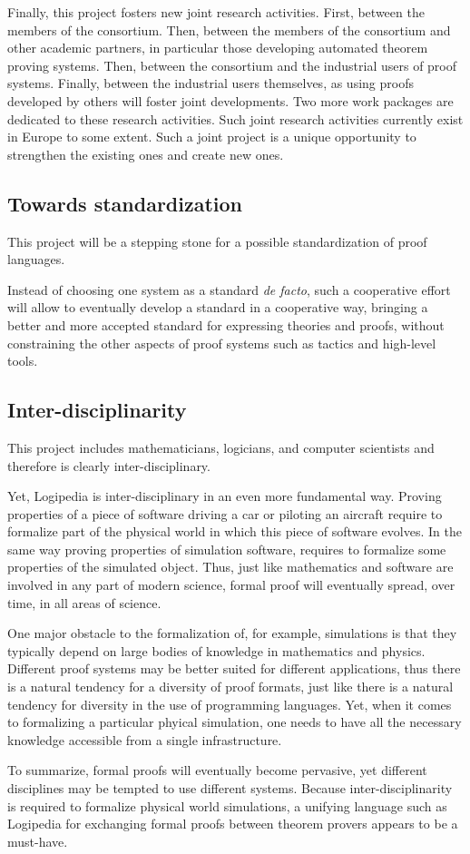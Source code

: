 Finally, this project fosters new joint research activities. First,
between the members of the consortium. Then, between the members of
the consortium and other academic partners, in particular those
developing automated theorem proving systems. Then, between the
consortium and the industrial users of proof systems. Finally, between
the industrial users themselves, as using proofs developed by others
will foster joint developments. Two more work packages are dedicated
to these research activities.  Such joint research activities
currently exist in Europe to some extent.  Such a joint project is a
unique opportunity to strengthen the existing ones and create new
ones.

\subsection{Towards standardization}
This project will be a stepping stone for a possible standardization
of proof languages.

Instead of choosing one system as a standard {\em de facto}, such a
cooperative effort will allow to eventually develop a standard in a
cooperative way, bringing a better and more accepted standard for
expressing theories and proofs, without constraining the other aspects
of proof systems such as tactics and high-level tools.

\subsection{Inter-disciplinarity}
This project includes mathematicians, logicians, and computer
scientists and therefore is clearly inter-disciplinary.

Yet, Logipedia is inter-disciplinary in an even more fundamental
way. Proving properties of a piece of software driving a car or
piloting an aircraft require to formalize part of the physical world
in which this piece of software evolves. In the same way proving
properties of simulation software, requires to formalize some
properties of the simulated object.  Thus, just like mathematics and
software are involved in any part of modern science, formal proof will
eventually spread, over time, in all areas of science. 

One major obstacle to the formalization of, for example, simulations
is that they typically depend on large bodies of knowledge in
mathematics and physics.  Different proof systems may be better
suited for different applications, thus there is a natural tendency
for a diversity of proof formats, just like there is a natural
tendency for diversity in the use of programming languages.  Yet, when
it comes to formalizing a particular phyical simulation, one needs to
have all the necessary knowledge accessible from a single infrastructure.

To summarize, formal proofs will eventually become pervasive, yet
different disciplines may be tempted to use different systems.
Because inter-disciplinarity is required to formalize physical world
simulations, a unifying language such as Logipedia for exchanging
formal proofs between theorem provers appears to be a must-have.

